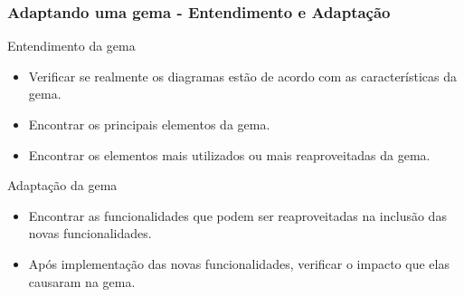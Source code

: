\begin{frame}
\frametitle{Adaptando uma gema - Entendimento e Adaptação}

  \begin{block}{Entendimento da gema}

   \begin{itemize}

    \item Verificar se realmente os diagramas estão de acordo com as características da gema.

    \item Encontrar os principais elementos da gema.

    \item Encontrar os elementos mais utilizados ou mais reaproveitadas da gema.

   \end{itemize}

  \end{block}

  \begin{block}{Adaptação da gema}

   \begin{itemize}

    \item Encontrar as funcionalidades que podem ser reaproveitadas na inclusão das novas funcionalidades.

    \item Após implementação das novas funcionalidades, verificar o impacto que elas causaram na gema.

   \end{itemize}

  \end{block}

\end{frame}
